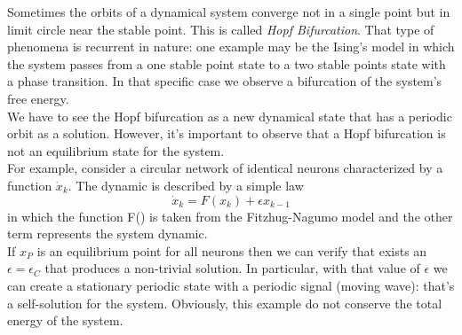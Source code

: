 Sometimes the orbits of a dynamical system converge not in a single point but in limit circle near the stable point.
This is called \emph{Hopf Bifurcation}.
That type of phenomena is recurrent in nature: one example may be the Ising's model in which the system passes from a one stable point state to a two stable points state with a phase transition.
In that specific case we observe a bifurcation of the system's free energy.\\
We have to see the Hopf bifurcation as a new dynamical state that has a periodic orbit as a solution.
However, it's important to observe that a Hopf bifurcation is not an equilibrium state for the system.\\
For example, consider a circular network of identical neurons characterized by a function $\dot{x}_k$.
The dynamic is described by a simple law
$$
    \dot{x}_k=F(x_k)+\epsilon x_{k-1}
$$
in which the function F() is taken from the Fitzhug-Nagumo model and the other term represents the system dynamic.\\
If $x_P$ is an equilibrium point for all neurons then we can verify that exists an $\epsilon=\epsilon_C$ that produces a non-trivial solution.
In particular, with that value of $\epsilon$ we can create a stationary periodic state with a periodic signal (moving wave): that's a self-solution for the system.
Obviously, this example do not conserve the total energy of the system.
